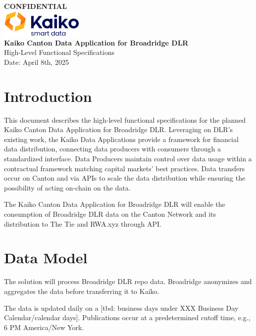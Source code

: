 \documentclass[11pt,a4paper]{article}
\begin{document}
\begin{center}
\vspace*{1cm}
\textbf{CONFIDENTIAL}\\[2cm]

\includegraphics[width=0.3\textwidth]{kaiko_logo.png}\\[1.5cm]

{\Huge \textbf{Kaiko Canton Data Application for Broadridge DLR}}\\[0.5cm]
{\Large High-Level Functional Specifications}\\[1cm]
{\large Date: April 8th, 2025}\\[2cm]
\end{center}


\section{Introduction}

This document describes the high-level functional specifications for the planned Kaiko Canton Data Application for Broadridge DLR. Leveraging on DLR's existing work, the Kaiko Data Applications provide a framework for financial data distribution, connecting data producers with consumers through a standardized interface. Data Producers maintain control over data usage within a contractual framework matching capital markets' best practices. Data transfers occur on Canton and via APIs to scale the data distribution while ensuring the possibility of acting on-chain on the data.

The Kaiko Canton Data Application for Broadridge DLR will enable the consumption of Broadridge DLR data on the Canton Network and its distribution to The Tie and RWA.xyz through API.

\section{Data Model}

The solution will process Broadridge DLR repo data. Broadridge anonymizes and aggregates the data before transferring it to Kaiko.

The data is updated daily on a [tbd: business days under XXX Business Day Calendar/calendar days]. Publications occur at a predetermined cutoff time, e.g., 6 PM America/New York.
\end{document}
